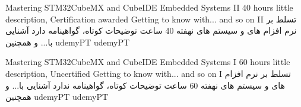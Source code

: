 
\professionalTrainingCI
{Mastering STM32CubeMX and CubeIDE Embedded Systems II}
{40 hours}
{little description, Certification awarded}
{Getting to know with... and so on II}
{تسلط بر نرم افزام های  و  سیستم های نهفته }
{40 ساعت}
{توضیحات کوتاه، گواهینامه دارد}
{آشنایی با... و همچنین }
{udemyPT}
\professionalTrainingCII
{}
{}
{}
{udemyPT}

\professionalTrainingCI
{Mastering STM32CubeMX and CubeIDE Embedded Systems I}
{60 hours}
{little description, Uncertified}
{Getting to know with... and so on I}
{تسلط بر نرم افزام های  و  سیستم های نهفته }
{60 ساعت}
{توضیحات کوتاه، گواهینامه ندارد}
{آشنایی با... و همچنین }
{udemyPT}
\professionalTrainingCII
{}
{}
{}
{udemyPT}

